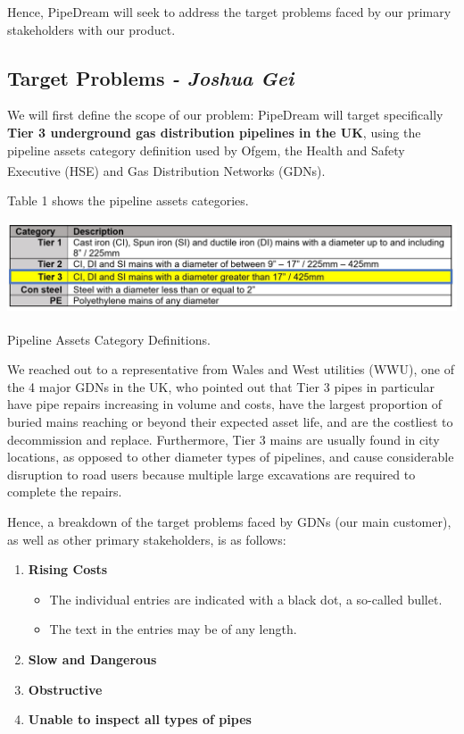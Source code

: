 \documentclass[11pt]{article}		%
\newcommand{\supercite}[1]{\textsuperscript{\cite{#1}}}		%
\begin{document}
Hence, PipeDream will seek to address the target problems faced by our primary stakeholders with our product. 

	\subsection[Target Problems]{Target Problems \textit{- Joshua Gei}}
We will first define the scope of our problem: PipeDream will target specifically \textbf{Tier 3 underground gas distribution pipelines in the UK}, using the pipeline assets category definition used by Ofgem, the Health and Safety Executive (HSE) and Gas Distribution Networks (GDNs)\supercite{pct2020states}. 

Table 1 shows the pipeline assets categories. 

    \begin{table}[h]
    \centering
  \includegraphics[width=\textwidth]{GasTiers}
  \caption{Pipeline Assets Category Definitions\supercite{pct2020states}.}
  \label{GasTiers}
    \end{table}
We reached out to a representative from Wales and West utilities (WWU), one of the 4 major GDNs in the UK, who pointed out that Tier 3 pipes in particular have pipe repairs increasing in volume and costs, have the largest proportion of buried mains reaching or beyond their expected asset life, and are the costliest to decommission and replace. Furthermore, Tier 3 mains are usually found in city locations, as opposed to other diameter types of pipelines, and cause considerable disruption to road users because multiple large excavations are required to complete the repairs.

Hence, a breakdown of the target problems faced by GDNs (our main customer), as well as other primary stakeholders, is as follows: 

\begin{enumerate}
   \item \textbf{Rising Costs}
   \begin{itemize}
     \item The individual entries are indicated with a black dot, a so-called bullet.
     \item The text in the entries may be of any length.
   \end{itemize}
   \item \textbf{Slow and Dangerous}
   \item \textbf{Obstructive}
   \item \textbf{Unable to inspect all types of pipes}
\end{enumerate}
\end{document}
